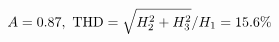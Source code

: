\documentclass[preview]{standalone}
\begin{document}
\begin{align*}
\special{dvisvgm:raw <g id='unique000'>}A=0.87,\ \text{THD}=\sqrt{H_2^2+H_3^2}/H_1=15.6\%\special{dvisvgm:raw </g>}
\end{align*}
\end{document}
